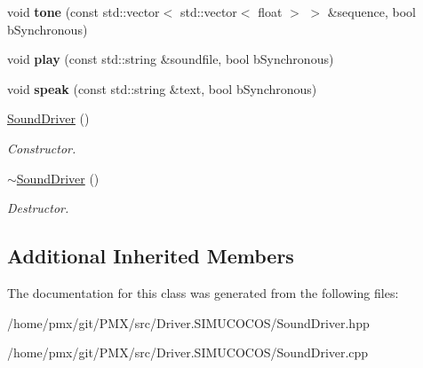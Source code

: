 \begin{DoxyCompactItemize}
void {\bfseries tone} (const std\+::vector$<$ std\+::vector$<$ float $>$ $>$ \&sequence, bool b\+Synchronous)
\item 
\mbox{\label{classSoundDriver_afd64ca3d517d01947d514eb689027eea}} 
void {\bfseries play} (const std\+::string \&soundfile, bool b\+Synchronous)
\item 
\mbox{\label{classSoundDriver_a44869623a4c7ad03e9a65388647bc10c}} 
void {\bfseries speak} (const std\+::string \&text, bool b\+Synchronous)
\item 
\mbox{\label{classSoundDriver_aa45970b1e9155eb51a155cc7ef4389dc}} 
\hyperlink{classSoundDriver_aa45970b1e9155eb51a155cc7ef4389dc}{Sound\+Driver} ()
\begin{DoxyCompactList}\small\item\em Constructor. \end{DoxyCompactList}\item 
\mbox{\label{classSoundDriver_a45845cb8587a626a4ab6a2c53dcdf7c0}} 
\hyperlink{classSoundDriver_a45845cb8587a626a4ab6a2c53dcdf7c0}{$\sim$\+Sound\+Driver} ()
\begin{DoxyCompactList}\small\item\em Destructor. \end{DoxyCompactList}\end{DoxyCompactItemize}
\subsection*{Additional Inherited Members}


The documentation for this class was generated from the following files\+:\begin{DoxyCompactItemize}
\item 
/home/pmx/git/\+P\+M\+X/src/\+Driver.\+S\+I\+M\+U\+C\+O\+C\+O\+S/Sound\+Driver.\+hpp\item 
/home/pmx/git/\+P\+M\+X/src/\+Driver.\+S\+I\+M\+U\+C\+O\+C\+O\+S/Sound\+Driver.\+cpp\end{DoxyCompactItemize}
